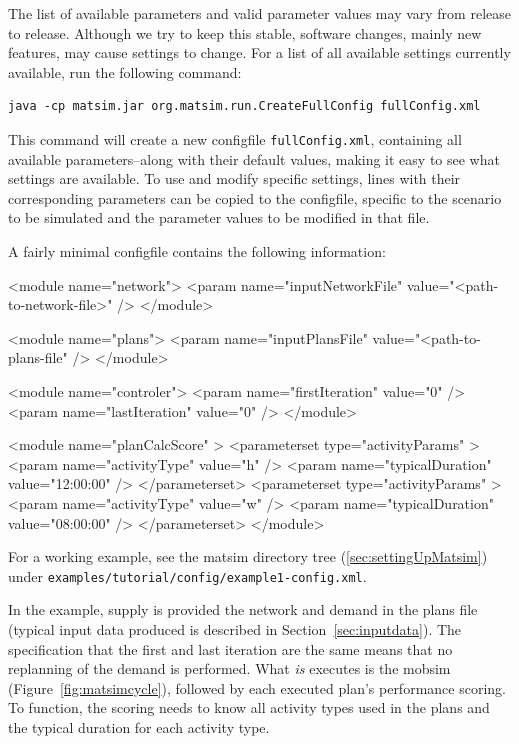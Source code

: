 The list of available parameters and valid parameter values may vary from release to release. Although we try to keep this stable,
software changes, mainly new features, may cause settings to change. For a list of all available settings currently available, run the following command:
\begin{lstlisting}
java -cp matsim.jar org.matsim.run.CreateFullConfig fullConfig.xml
\end{lstlisting}
%
This command will create a new \gls{configfile} \lstinline|fullConfig.xml|, containing all available parameters--along with their default values, making it easy to see what settings are available. To use and modify specific settings, lines with their corresponding parameters can be copied to the \gls{configfile}, specific to the \gls{scenario} to be simulated and the parameter values to be modified in that file. 

A fairly minimal \gls{configfile} contains the following information:
\begin{xml}
<module name="network">
   <param name="inputNetworkFile" value="<path-to-network-file>" />
</module>

<module name="plans">
   <param name="inputPlansFile" value="<path-to-plans-file" />
</module>

<module name="controler">
   <param name="firstIteration" value="0" />
   <param name="lastIteration" value="0" />
</module>

<module name="planCalcScore" >
   <parameterset type="activityParams" >
      <param name="activityType" value="h" />
      <param name="typicalDuration" value="12:00:00" />
   </parameterset>
   <parameterset type="activityParams" >
      <param name="activityType" value="w" />
      <param name="typicalDuration" value="08:00:00" />
   </parameterset>
</module>
\end{xml}
For a working example, see the \gls{matsim} directory tree (\cf \ref{sec:settingUpMatsim}) under \lstinline{examples/tutorial/config/example1-config.xml}.
 
In the example, supply is provided 
the network and demand in the plans file (typical input data produced is described in Section~\ref{sec:inputdata}). 
%
The specification that the first and last iteration are the same means that no \gls{replanning} of the demand is performed.  
%
What \emph{is} executes is the \gls{mobsim} (Figure~\ref{fig:matsimcycle}), followed by each executed plan's performance scoring.
%
To function, the scoring needs to know all activity types used in the plans and the typical duration for each activity type.

